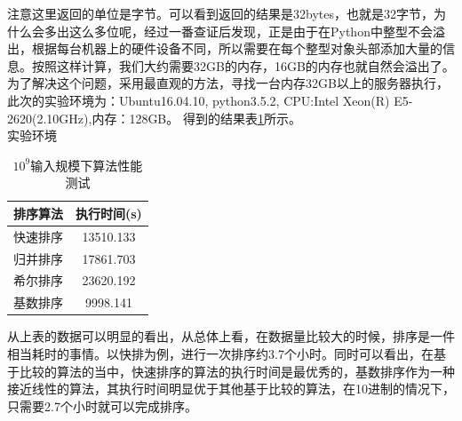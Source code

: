 \documentclass[UTF8]{ctexart}
\begin{document}
注意这里返回的单位是字节。可以看到返回的结果是32bytes，也就是32字节，为什么会多出这么多位呢，经过一番查证后发现，正是由于在Python中整型不会溢出，根据每台机器上的硬件设备不同，所以需要在每个整型对象头部添加大量的信息。按照这样计算，我们大约需要32GB的内存，16GB的内存也就自然会溢出了。\\

为了解决这个问题，采用最直观的方法，寻找一台内存32GB以上的服务器执行，此次的实验环境为：Ubuntu16.04.10, python3.5.2, CPU:Intel Xeon(R) E5-2620(2.10GHz),内存：128GB。
得到的结果表\ref{table-1}所示。\\
实验环境

\begin{table}[H]
    \caption{$10^9$输入规模下算法性能测试}
    \label{table-1}
    \begin{center}
        \begin{tabular}{cc}
            \hline
            排序算法&   执行时间(s)\\     
            \hline
            快速排序&       13510.133\\               
            归并排序&       17861.703\\              
            希尔排序&       23620.192\\             
            基数排序&      9998.141\\                      
            \hline
        \end{tabular}  
    \end{center}
\end{table}

从上表的数据可以明显的看出，从总体上看，在数据量比较大的时候，排序是一件相当耗时的事情。以快排为例，进行一次排序约3.7个小时。同时可以看出，在基于比较的算法的当中，快速排序的算法的执行时间是最优秀的，基数排序作为一种接近线性的算法，其执行时间明显优于其他基于比较的算法，在10进制的情况下，只需要2.7个小时就可以完成排序。
\end{document}
